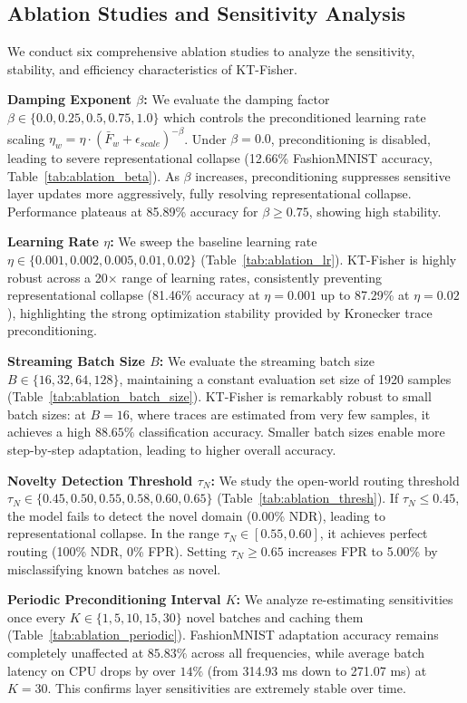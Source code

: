 \documentclass{article}
\theoremstyle{plain}
\theoremstyle{definition}
\theoremstyle{remark}
\begin{document}
\subsection{Ablation Studies and Sensitivity Analysis}
We conduct six comprehensive ablation studies to analyze the sensitivity, stability, and efficiency characteristics of KT-Fisher.

\textbf{Damping Exponent \(\beta\):} We evaluate the damping factor \(\beta \in \{0.0, 0.25, 0.5, 0.75, 1.0\}\) which controls the preconditioned learning rate scaling \(\eta_w = \eta \cdot (\bar{F}_w + \epsilon_{scale})^{-\beta}\). Under \(\beta = 0.0\), preconditioning is disabled, leading to severe representational collapse (12.66\% FashionMNIST accuracy, Table~\ref{tab:ablation_beta}). As \(\beta\) increases, preconditioning suppresses sensitive layer updates more aggressively, fully resolving representational collapse. Performance plateaus at 85.89\% accuracy for \(\beta \geq 0.75\), showing high stability.

\textbf{Learning Rate \(\eta\):} We sweep the baseline learning rate \(\eta \in \{0.001, 0.002, 0.005, 0.01, 0.02\}\) (Table~\ref{tab:ablation_lr}). KT-Fisher is highly robust across a 20\(\times\) range of learning rates, consistently preventing representational collapse (81.46\% accuracy at \(\eta = 0.001\) up to 87.29\% at \(\eta = 0.02\)), highlighting the strong optimization stability provided by Kronecker trace preconditioning.

\textbf{Streaming Batch Size \(B\):} We evaluate the streaming batch size \(B \in \{16, 32, 64, 128\}\), maintaining a constant evaluation set size of 1920 samples (Table~\ref{tab:ablation_batch_size}). KT-Fisher is remarkably robust to small batch sizes: at \(B = 16\), where traces are estimated from very few samples, it achieves a high \(88.65\%\) classification accuracy. Smaller batch sizes enable more step-by-step adaptation, leading to higher overall accuracy.

\textbf{Novelty Detection Threshold \(\tau_N\):} We study the open-world routing threshold \(\tau_N \in \{0.45, 0.50, 0.55, 0.58, 0.60, 0.65\}\) (Table~\ref{tab:ablation_thresh}). If \(\tau_N \le 0.45\), the model fails to detect the novel domain (0.00\% NDR), leading to representational collapse. In the range \(\tau_N \in [0.55, 0.60]\), it achieves perfect routing (100\% NDR, 0\% FPR). Setting \(\tau_N \ge 0.65\) increases FPR to 5.00\% by misclassifying known batches as novel.

\textbf{Periodic Preconditioning Interval \(K\):} We analyze re-estimating sensitivities once every \(K \in \{1, 5, 10, 15, 30\}\) novel batches and caching them (Table~\ref{tab:ablation_periodic}). FashionMNIST adaptation accuracy remains completely unaffected at \(85.83\%\) across all frequencies, while average batch latency on CPU drops by over \(14\%\) (from 314.93 ms down to 271.07 ms) at \(K=30\). This confirms layer sensitivities are extremely stable over time.
\end{document}

